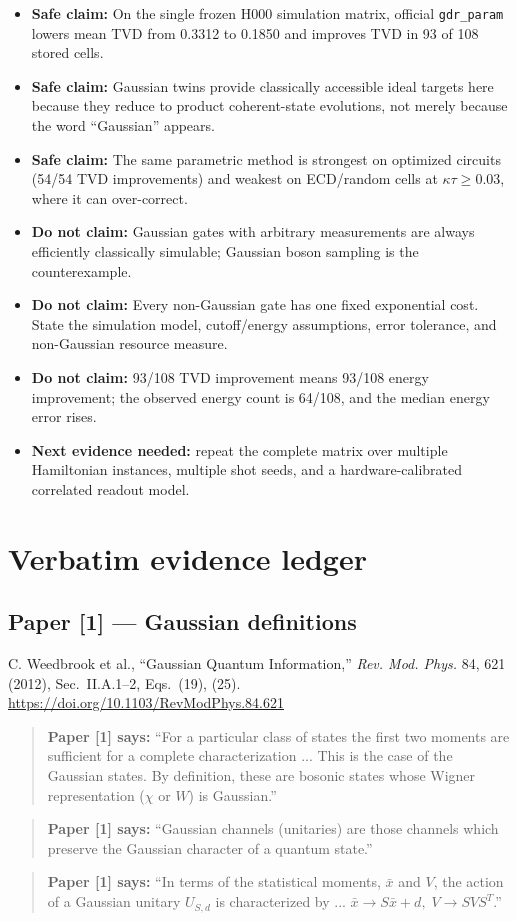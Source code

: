 \documentclass[10pt]{article}
\newcommand{\code}[1]{\texttt{#1}}
\newcommand{\paperquote}[2]{%
  \begin{quote}\small\textbf{Paper [#1] says:} ``#2''\end{quote}}
\begin{document}
\begin{itemize}[itemsep=4pt]
\item \textbf{Safe claim:} On the single frozen H000 simulation matrix, official \code{gdr\_param}
lowers mean TVD from 0.3312 to 0.1850 and improves TVD in 93 of 108 stored cells.
\item \textbf{Safe claim:} Gaussian twins provide classically accessible ideal targets here because
they reduce to product coherent-state evolutions, not merely because the word ``Gaussian'' appears.
\item \textbf{Safe claim:} The same parametric method is strongest on optimized circuits (54/54 TVD
improvements) and weakest on ECD/random cells at $\kappa\tau\ge0.03$, where it can over-correct.
\item \textbf{Do not claim:} Gaussian gates with arbitrary measurements are always efficiently
classically simulable; Gaussian boson sampling is the counterexample.
\item \textbf{Do not claim:} Every non-Gaussian gate has one fixed exponential cost. State the
simulation model, cutoff/energy assumptions, error tolerance, and non-Gaussian resource measure.
\item \textbf{Do not claim:} 93/108 TVD improvement means 93/108 energy improvement; the observed
energy count is 64/108, and the median energy error rises.
\item \textbf{Next evidence needed:} repeat the complete matrix over multiple Hamiltonian instances,
multiple shot seeds, and a hardware-calibrated correlated readout model.
\end{itemize}

\appendix
\section{Verbatim evidence ledger}

\subsection*{Paper [1] --- Gaussian definitions}
C. Weedbrook et al., ``Gaussian Quantum Information,'' \emph{Rev. Mod. Phys.} 84, 621 (2012),
Sec.~II.A.1--2, Eqs.~(19), (25).
\url{https://doi.org/10.1103/RevModPhys.84.621}

\paperquote{1}{For a particular class of states the first two moments are sufficient for a complete
characterization ... This is the case of the Gaussian states. By definition, these are bosonic
states whose Wigner representation (\(\chi\) or \(W\)) is Gaussian.}
\paperquote{1}{Gaussian channels (unitaries) are those channels which preserve the Gaussian
character of a quantum state.}
\paperquote{1}{In terms of the statistical moments, \(\bar{x}\) and \(V\), the action of a Gaussian
unitary \(U_{S,d}\) is characterized by ... \(\bar{x}\to S\bar{x}+d,\;
V\to SVS^T\).}
\end{document}
